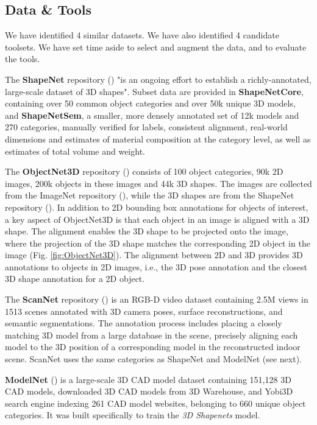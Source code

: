 \subsection{Data \& Tools}
\label{data-and-tools}
We have identified 4 similar datasets. We have also identified 4 candidate toolsets. We have set time aside to select and augment the data, and to evaluate the tools.

The \textbf{ShapeNet} repository (\cite{chang2015shapenet}) "is an ongoing effort to establish a richly-annotated, large-scale dataset of 3D shapes". Subset data are provided in \textbf{ShapeNetCore}, containing over 50 common object categories and over 50k unique 3D models, and \textbf{ShapeNetSem}, a smaller, more densely annotated set of 12k models and 270 categories, manually verified for labels, consistent alignment, real-world dimensions and estimates of material composition at the category level, as well as estimates of total volume and weight.

The \textbf{ObjectNet3D} repository (\cite{xiang2016objectnet3d}) consists of 100 object categories, 90k 2D
images, 200k objects in these images and 44k 3D shapes. The images
are collected from the ImageNet repository (\cite{imagenet_cvpr09}), while the 3D shapes
are from the ShapeNet repository (\cite{chang2015shapenet}). In addition to 2D bounding box annotations for objects of interest, a key aspect of ObjectNet3D is that each object
in an image is aligned with a 3D shape. The alignment enables
the 3D shape to be projected onto the image, where the projection of the 3D shape matches the
corresponding 2D object in the image (Fig. \ref{fig:ObjectNet3D}). The alignment
between 2D and 3D provides 3D annotations to objects in 2D images, i.e., the
3D pose annotation and the closest 3D shape annotation for a 2D object.  

The \textbf{ScanNet} repository (\cite{dai2017scannet}) is an RGB-D video dataset containing 2.5M views in 1513 scenes annotated with 3D camera poses, surface reconstructions, and semantic segmentations. The annotation process includes placing a closely matching 3D model from a large database in the scene, precisely aligning each model to the 3D position of a corresponding model in the reconstructed indoor scene. ScanNet uses the same categories as ShapeNet and ModelNet (see next).  

\textbf{ModelNet} (\cite{ModelNetwu20143d}) is a large-scale 3D CAD model dataset containing 151,128 3D CAD models, downloaded 3D CAD models from 3D Warehouse, and Yobi3D search engine indexing 261 CAD model websites, belonging to 660 unique object categories. It was built specifically to train the \textit{3D Shapenets} model. 

